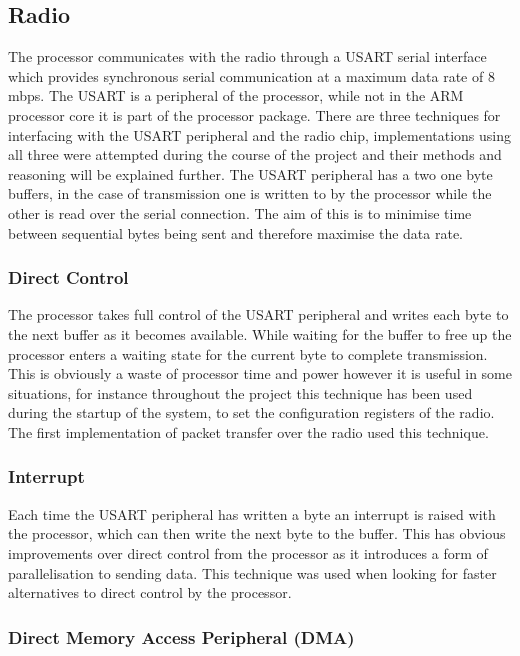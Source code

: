 \documentclass[parskip]{cs4rep}
\begin{document}
\subsection{Radio}

The processor communicates with the radio through a USART serial interface which provides synchronous serial communication at a maximum data rate of 8 mbps. The USART is a peripheral of the processor, while not in the ARM processor core it is part of the processor package. There are three techniques for interfacing with the USART peripheral and the radio chip, implementations using all three were attempted during the course of the project and their methods and reasoning will be explained further. The USART peripheral has a two one byte buffers, in the case of transmission one is written to by the processor while the other is read over the serial connection. The aim of this is to minimise time between sequential bytes being sent and therefore maximise the data rate. 

\subsubsection{Direct Control}

The processor takes full control of the USART peripheral and writes each byte to the next buffer as it becomes available. While waiting for the buffer to free up the processor enters a waiting state for the current byte to complete transmission. This is obviously a waste of processor time and power however it is useful in some situations, for instance throughout the project this technique has been used during the startup of the system, to set the configuration registers of the radio. The first implementation of packet transfer over the radio used this technique. 

\subsubsection{Interrupt}

Each time the USART peripheral has written a byte an interrupt is raised with the processor, which can then write the next byte to the buffer. This has obvious improvements over direct control from the processor as it introduces a form of parallelisation to sending data. This technique was used when looking for faster alternatives to direct control by the processor. 

\subsubsection{Direct Memory Access Peripheral (DMA)}
\end{document}
